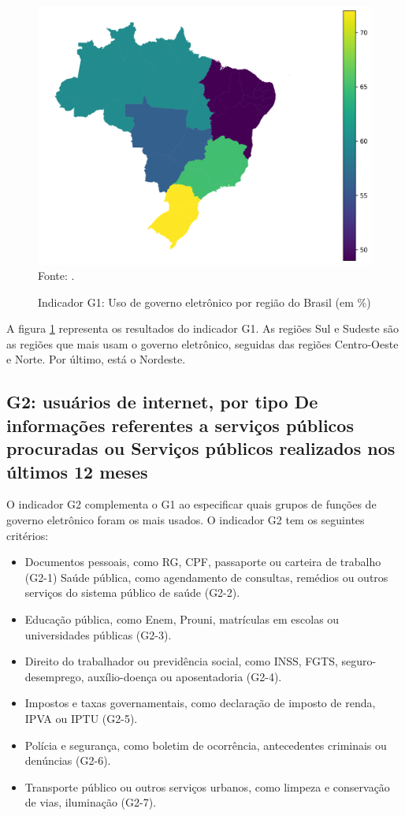 \begin{figure}[H]
	\centering
	\caption{Indicador G1: Uso de governo eletrônico por região do Brasil (em \%)}
	\includegraphics[width=1\linewidth]{figuras/mapa_coropletico_tic_domicilios_2024_g1}
	\label{fig:mapa_coropletico_tic_domicilio_g1}
	\footnotesize{Fonte: \cite{tic_domicilios_2024_g1}.}
\end{figure}

A figura \ref{fig:mapa_coropletico_tic_domicilio_g1} representa os resultados do indicador G1. As regiões Sul e Sudeste são as regiões que mais usam o governo eletrônico, seguidas das regiões Centro-Oeste e Norte. Por último, está o Nordeste.

\subsection{G2: usuários de internet, por tipo De informações referentes a serviços públicos procuradas ou Serviços públicos realizados nos últimos 12 meses}

O indicador G2 complementa o G1 ao especificar quais grupos de funções de governo eletrônico foram os mais usados. O indicador G2 tem os seguintes critérios:

\begin{itemize}
	\item Documentos pessoais, como RG, CPF, passaporte ou carteira de trabalho (G2-1)
	Saúde pública, como agendamento de consultas, remédios ou outros serviços do sistema público de saúde (G2-2).
	\item Educação pública, como Enem, Prouni, matrículas em escolas ou universidades públicas (G2-3).
	\item Direito do trabalhador ou previdência social, como INSS, FGTS, seguro-desemprego, auxílio-doença ou aposentadoria (G2-4).
	\item Impostos e taxas governamentais, como declaração de imposto de renda, IPVA ou IPTU (G2-5).
	\item Polícia e segurança, como boletim de ocorrência, antecedentes criminais ou denúncias (G2-6).
	\item Transporte público ou outros serviços urbanos, como limpeza e conservação de vias, iluminação (G2-7).
\end{itemize}


